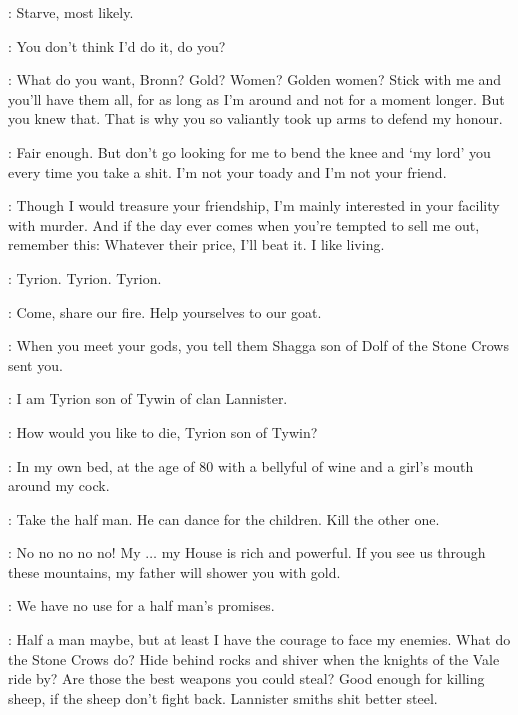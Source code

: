 \TYRION: Starve, most likely. 

\BRONN: You don't think I'd do it, do you? 

\TYRION: What do you want, Bronn? Gold? Women? Golden women? Stick with me and you'll have them all, for as long as I'm around and not for a moment longer. But you knew that. That is why you so valiantly took up arms to defend my honour. 

\BRONN: Fair enough.  But don't go looking for me to bend the knee and `my lord' you every time you take a shit. I'm not your toady and I'm not your friend. 

\TYRION: Though I would treasure your friendship, I'm mainly interested in your facility with murder. And if the day ever comes when you're tempted to sell me out, remember this: Whatever their price, I'll beat it. I like living. 


\BRONN: Tyrion. Tyrion. Tyrion. 


\TYRION: Come, share our fire. Help yourselves to our goat. 

\SHAGGA: When you meet your gods, you tell them Shagga son of Dolf of the Stone Crows sent you. 

\TYRION: I am Tyrion son of Tywin of clan Lannister. 

\SHAGGA: How would you like to die, Tyrion son of Tywin? 

\TYRION: In my own bed, at the age of 80 with a bellyful of wine and a girl's mouth around my cock. 

\SHAGGA:  Take the half man. He can dance for the children. Kill the other one. 


\TYRION: No no no no no! My $\ldots$ my House is rich and powerful. If you see us through these mountains, my father will shower you with gold. 

\SHAGGA: We have no use for a half man's promises.

\TYRION: Half a man maybe, but at least I have the courage to face my enemies. What do the Stone Crows do? Hide behind rocks and shiver when the knights of the Vale ride by? Are those the best weapons you could steal? Good enough for killing sheep, if the sheep don't fight back. Lannister smiths shit better steel. 

